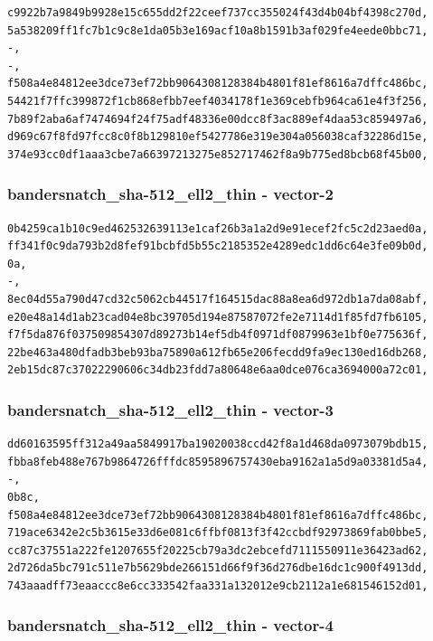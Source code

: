\documentclass[
]{article}
\begin{document}
\begin{verbatim}
c9922b7a9849b9928e15c655dd2f22ceef737cc355024f43d4b04bf4398c270d,
5a538209ff1fc7b1c9c8e1da05b3e169acf10a8b1591b3af029fe4eede0bbc71,
-,
-,
f508a4e84812ee3dce73ef72bb9064308128384b4801f81ef8616a7dffc486bc,
54421f7ffc399872f1cb868efbb7eef4034178f1e369cebfb964ca61e4f3f256,
7b89f2aba6af7474694f24f75adf48336e00dcc8f3ac889ef4daa53c859497a6,
d969c67f8fd97fcc8c0f8b129810ef5427786e319e304a056038caf32286d15e,
374e93cc0df1aaa3cbe7a66397213275e852717462f8a9b775ed8bcb68f45b00,
\end{verbatim}

\subsubsection{bandersnatch\_sha-512\_ell2\_thin -
vector-2}\label{bandersnatch_sha-512_ell2_thin---vector-2}

\begin{verbatim}
0b4259ca1b10c9ed462532639113e1caf26b3a1a2d9e91ecef2fc5c2d23aed0a,
ff341f0c9da793b2d8fef91bcbfd5b55c2185352e4289edc1dd6c64e3fe09b0d,
0a,
-,
8ec04d55a790d47cd32c5062cb44517f164515dac88a8ea6d972db1a7da08abf,
e20e48a14d1ab23cad04e8bc39705d194e87587072fe2e7114d1f85fd7fb6105,
f7f5da876f037509854307d89273b14ef5db4f0971df0879963e1bf0e775636f,
22be463a480dfadb3beb93ba75890a612fb65e206fecdd9fa9ec130ed16db268,
2eb15dc87c37022290606c34db23fdd7a80648e6aa0dce076ca3694000a72c01,
\end{verbatim}

\subsubsection{bandersnatch\_sha-512\_ell2\_thin -
vector-3}\label{bandersnatch_sha-512_ell2_thin---vector-3}

\begin{verbatim}
dd60163595ff312a49aa5849917ba19020038ccd42f8a1d468da0973079bdb15,
fbba8feb488e767b9864726fffdc8595896757430eba9162a1a5d9a03381d5a4,
-,
0b8c,
f508a4e84812ee3dce73ef72bb9064308128384b4801f81ef8616a7dffc486bc,
719ace6342e2c5b3615e33d6e081c6ffbf0813f3f42ccbdf92973869fab0bbe5,
cc87c37551a222fe1207655f20225cb79a3dc2ebcefd7111550911e36423ad62,
2d726da5bc791c511e7b5629bde266151d66f9f36d276dbe16dc1c900f4913dd,
743aaadff73eaaccc8e6cc333542faa331a132012e9cb2112a1e681546152d01,
\end{verbatim}

\subsubsection{bandersnatch\_sha-512\_ell2\_thin -
vector-4}\label{bandersnatch_sha-512_ell2_thin---vector-4}
\end{document}
